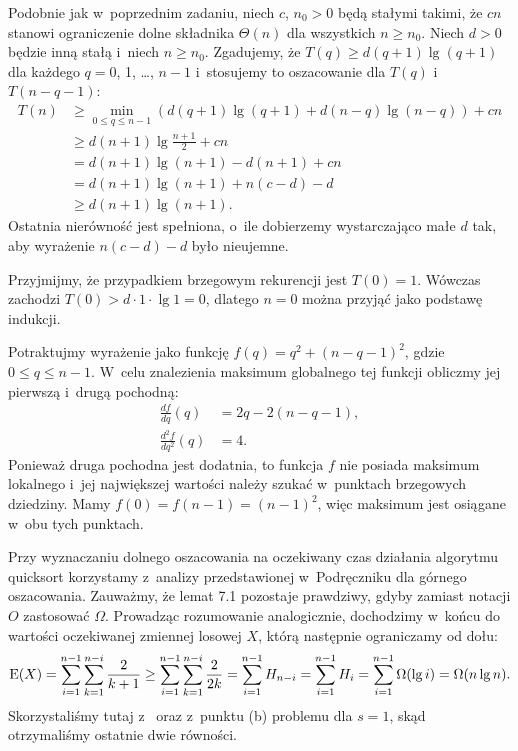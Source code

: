 Podobnie jak w~poprzednim zadaniu, niech $c$, $n_0>0$ będą stałymi takimi, że $cn$ stanowi ograniczenie dolne składnika $\Theta(n)$ dla wszystkich $n\ge n_0$.
Niech $d>0$ będzie inną stałą i~niech $n\ge n_0$.
Zgadujemy, że $T(q)\ge d(q+1)\lg(q+1)$ dla każdego $q=0$, 1, \dots, $n-1$ i~stosujemy to oszacowanie dla $T(q)$ i~$T(n-q-1)$:
\begin{align*}
    T(n) &\ge \min_{0\le q\le n-1}(d(q+1)\lg(q+1)+d(n-q)\lg(n-q))+cn \\
    &\ge d(n+1)\lg\frac{n+1}{2}+cn \\
	&= d(n+1)\lg(n+1)-d(n+1)+cn \\
	&= d(n+1)\lg(n+1)+n(c-d)-d \\
	&\ge d(n+1)\lg(n+1).
\end{align*}
Ostatnia nierówność jest spełniona, o~ile dobierzemy wystarczająco małe $d$ tak, aby wyrażenie $n(c-d)-d$ było nieujemne.

Przyjmijmy, że przypadkiem brzegowym rekurencji jest $T(0)=1$.
Wówczas zachodzi $T(0)>d\cdot1\cdot\lg1=0$, dlatego $n=0$ można przyjąć jako podstawę indukcji.

\exercise %
Potraktujmy wyrażenie jako funkcję $f(q)=q^2+(n-q-1)^2$, gdzie $0\le q\le n-1$.
W~celu znalezienia maksimum globalnego tej funkcji obliczmy jej pierwszą i~drugą pochodną:
\begin{align*}
    \frac{df}{dq}(q) &= 2q-2(n-q-1), \\
	\frac{d^2\!f}{dq^2}(q) &= 4.
\end{align*}
Ponieważ druga pochodna jest dodatnia, to funkcja $f$ nie posiada maksimum lokalnego i~jej największej wartości należy szukać w~punktach brzegowych dziedziny.
Mamy $f(0)=f(n-1)=(n-1)^2$, więc maksimum jest osiągane w~obu tych punktach.

\exercise %
Przy wyznaczaniu dolnego oszacowania na oczekiwany czas działania algorytmu quicksort korzystamy z~analizy przedstawionej w~Podręczniku dla górnego oszacowania.
Zauważmy, że lemat 7.1 pozostaje prawdziwy, gdyby zamiast notacji $O$ zastosować $\Omega$.
Prowadząc rozumowanie analogicznie, dochodzimy w~końcu do wartości oczekiwanej zmiennej losowej $X$, którą następnie ograniczamy od dołu:
\[
	\operatorname{E}(X) = \sum_{i=1}^{n-1}\sum_{k=1}^{n-i}\frac{2}{k+1} \ge \sum_{i=1}^{n-1}\sum_{k=1}^{n-i}\frac{2}{2k} = \sum_{i=1}^{n-1}H_{n-i} = \sum_{i=1}^{n-1}H_i = \sum_{i=1}^{n-1}\Omega(\lg i) = \Omega(n\lg n).
\]
Skorzystaliśmy tutaj z~ oraz z~punktu (b) problemu  dla $s=1$, skąd otrzymaliśmy ostatnie dwie równości.


